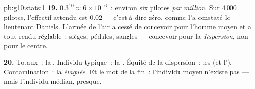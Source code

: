 \begin{solution}{pb:g10:stats:1}
\textbf{19.} $0.3^{10} \approx 6 \times 10^{-6}$~: environ six
pilotes \emph{par million}. Sur $4\,000$ pilotes, l'effectif attendu
est $0.02$ --- c'est-à-dire zéro, comme l'a constaté le lieutenant
Daniels. L'armée de l'air a cessé de concevoir pour l'homme moyen et
a tout rendu réglable~: sièges, pédales, sangles --- concevoir pour
la \emph{dispersion}, non pour le centre.

\textbf{20.} Totaux~: la \emph{}. Individu typique~: la
\emph{}. Équité de la dispersion~: les \emph{} (et
l'). Contamination~: la \emph{ élaguée}.
Et le mot de la fin~: l'individu moyen n'existe pas --- mais
l'individu médian, presque.
\end{solution}
